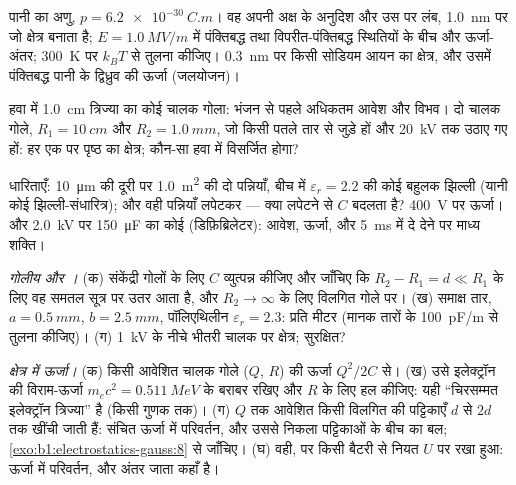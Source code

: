 \begin{exercise}[$\star\star$]\label{exo:b1:potential-capacitors:7}
पानी का अणु, $p = \qty{6.2e-30}{C.m}$। वह अपनी अक्ष के अनुदिश और उस पर लंब,
\qty{1.0}{nm} पर जो क्षेत्र बनाता है; $E = \qty{1.0}{MV/m}$ में पंक्तिबद्ध
तथा विपरीत-पंक्तिबद्ध स्थितियों के बीच  और ऊर्जा-अंतर;
\qty{300}{K} पर $k_BT$ से तुलना कीजिए। \qty{0.3}{nm} पर किसी सोडियम आयन का
क्षेत्र, और उसमें पंक्तिबद्ध पानी के द्विध्रुव की ऊर्जा (जलयोजन)।
\end{exercise}

\begin{exercise}[$\star\star$]\label{exo:b1:potential-capacitors:8}
हवा में \qty{1.0}{cm} त्रिज्या का कोई चालक गोला: भंजन से पहले अधिकतम आवेश
और विभव। दो चालक गोले, $R_1 = \qty{10}{cm}$
और $R_2 = \qty{1.0}{mm}$, जो किसी पतले तार से जुड़े हों और \qty{20}{kV} तक
उठाए गए हों: हर एक पर पृष्ठ का क्षेत्र; कौन-सा हवा में विसर्जित होगा?
\end{exercise}

\begin{exercise}[$\star\star$]\label{exo:b1:potential-capacitors:9}
धारिताएँ: \qty{10}{\micro m} की दूरी पर \qty{1.0}{m^2} की दो पन्नियाँ, बीच
में $\varepsilon_r = 2.2$ की कोई बहुलक झिल्ली (यानी कोई झिल्ली-संधारित्र); और वही
पन्नियाँ लपेटकर --- क्या लपेटने से $C$ बदलता है? \qty{400}{V} पर ऊर्जा। और
\qty{2.0}{kV} पर \qty{150}{\micro F} का कोई
 (डिफ़िब्रिलेटर): आवेश, ऊर्जा, और \qty{5}{ms} में दे देने पर माध्य
शक्ति।
\end{exercise}

\begin{exercise}[$\star\star\star$]\label{exo:b1:potential-capacitors:10}
\emph{गोलीय और ।} (क) संकेंद्री गोलों के लिए $C$
व्युत्पन्न कीजिए और जाँचिए कि $R_2 - R_1 = d \ll R_1$ के लिए वह समतल सूत्र
पर उतर आता है, और $R_2 \to \infty$ के लिए विलगित गोले पर।
(ख) समाक्ष तार, $a = \qty{0.5}{mm}$, $b = \qty{2.5}{mm}$, पॉलिएथिलीन
$\varepsilon_r = 2.3$: प्रति मीटर  (मानक तारों के \qty{100}{pF/m}
से तुलना कीजिए)। (ग) \qty{1}{kV} के नीचे भीतरी चालक पर क्षेत्र;
सुरक्षित?
\end{exercise}

\begin{exercise}[$\star\star\star$]\label{exo:b1:potential-capacitors:11}
\emph{क्षेत्र में ऊर्जा।} (क) किसी आवेशित चालक गोले
($Q$, $R$) की ऊर्जा $Q^2/2C$ से। (ख) उसे इलेक्ट्रॉन की विराम-ऊर्जा
$m_ec^2 = \qty{0.511}{MeV}$ के बराबर रखिए और $R$ के लिए हल कीजिए: यही
``चिरसम्मत इलेक्ट्रॉन त्रिज्या'' है (किसी गुणक तक)। (ग) $Q$ तक आवेशित किसी
विलगित  की पट्टिकाएँ $d$ से $2d$ तक खींची जाती हैं: संचित
ऊर्जा में परिवर्तन, और उससे निकला पट्टिकाओं के बीच का बल;
\cref{exo:b1:electrostatics-gauss:8} से जाँचिए। (घ) वही, पर  किसी
बैटरी से नियत $U$ पर रखा हुआ: ऊर्जा में परिवर्तन, और अंतर जाता कहाँ है।
\end{exercise}

